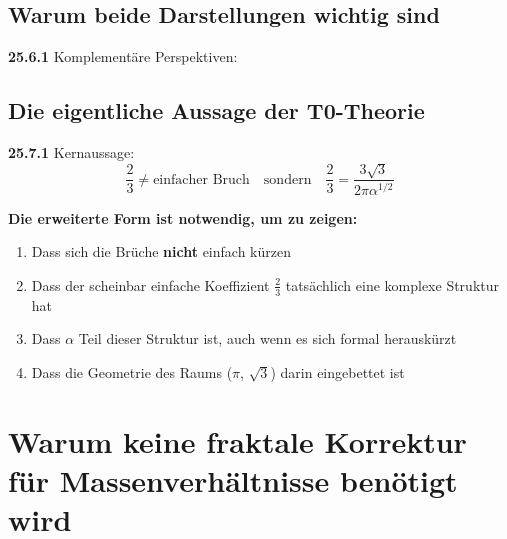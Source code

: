 \subsection{Warum beide Darstellungen wichtig sind}

\noindent \textbf{25.6.1} Komplementäre Perspektiven:


\subsection{Die eigentliche Aussage der T0-Theorie}

\noindent \textbf{25.7.1} Kernaussage:
\[
\boxed{
	\frac{2}{3} \neq \text{einfacher Bruch} \quad \text{sondern} \quad \frac{2}{3} = \frac{3\sqrt{3}}{2\pi\alpha^{1/2}}
}
\]

\begin{tcolorbox}[colback=green!5!white,colframe=green!75!black]
	\textbf{Die erweiterte Form ist notwendig, um zu zeigen:}
	\begin{enumerate}
		\item Dass sich die Brüche \textbf{nicht} einfach kürzen
		\item Dass der scheinbar einfache Koeffizient $\frac{2}{3}$ tatsächlich eine komplexe Struktur hat
		\item Dass $\alpha$ Teil dieser Struktur ist, auch wenn es sich formal herauskürzt
		\item Dass die Geometrie des Raums ($\pi$, $\sqrt{3}$) darin eingebettet ist
	\end{enumerate}
\end{tcolorbox}

\section{Warum keine fraktale Korrektur für Massenverhältnisse benötigt wird}

